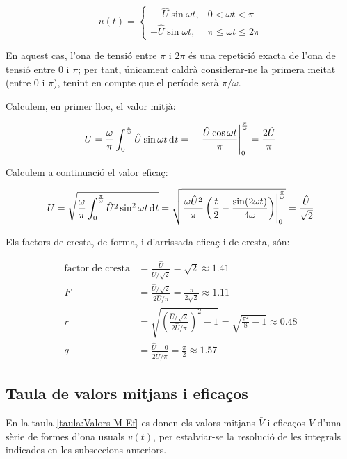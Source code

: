 \begin{exemple}[\FactorsCrestaFormaArr{}]
    \[
    u(t) = \begin{cases} \phantom{-}\hat{U} \sin\omega t, & 0 < \omega t < \pi\\
           -\hat{U} \sin\omega t, & \pi \leq \omega t \leq 2\pi \end{cases}
    \]

    En aquest cas, l'ona de tensió entre $\pi$ i $2\pi$ és una repetició
    exacta de l'ona de tensió entre 0 i $\pi$; per tant, únicament
    caldrà considerar-ne la primera meitat (entre 0 i $\pi$), tenint en
    compte que el període serà $\pi/\omega$.

     Calculem, en primer lloc, el valor mitjà:
     
     \[
    \bar{U} = \frac{\omega}{\pi} \int_0^\frac{\pi}{\omega} \hat{U}
    \sin\omega t \diff t  = - \left. \frac{\hat{U} \cos\omega t}{\pi}
    \right|_0^\frac{\pi}{\omega} = \frac{2 \hat{U}}{\pi}
    \]

    Calculem a continuació el valor eficaç:
    
    \[
    U = \sqrt{\frac{\omega}{\pi} \int_0^\frac{\pi}{\omega} \hat{U}^2
    \sin^2\omega t \diff t } =   \sqrt{\left.\frac{\omega
    \hat{U}^2}{\pi}\left( \frac{t}{2} - \frac{\sin (2\omega t)}{4\omega}
    \right)\right|_0^\frac{\pi}{\omega}}  = \frac{\hat{U}}{\sqrt{2}}
    \]

    Els factors de cresta, de forma, i d'arrissada eficaç i de cresta, són:
    
    \begin{align*}
        \text{factor de cresta} &= \frac{\hat{U}}{\hat{U}/\sqrt{2}} = \sqrt{2} \approx\num{1,41} \\[2ex]
        F &= \frac{\hat{U}/\sqrt{2}}{2 \hat{U}/\pi} =\frac{\pi}{2\sqrt{2}} \approx
        \num{1,11} \\[2ex]
    r &= \sqrt{\left(\frac{\hat{U}/\sqrt{2}}{2 \hat{U}/\pi}\right)^2-1}
    = \sqrt{\frac{\pi^2}{8}-1} \approx \num{0,48}\\[2ex]
    q &=  \frac{\hat{U} - 0}{2 \hat{U}/\pi} = \frac{\pi}{2} \approx \num{1,57}
    \end{align*}
\end{exemple}


\subsection{Taula de valors mitjans i eficaços}

En la taula \vref{taula:Valors-M-Ef}  es donen els valors mitjans $\bar{V}$ i eficaços $V$ d'una
sèrie de formes d'ona usuals $v(t)$, per estalviar-se la resolució de les integrals indicades en les subseccions anteriors.

